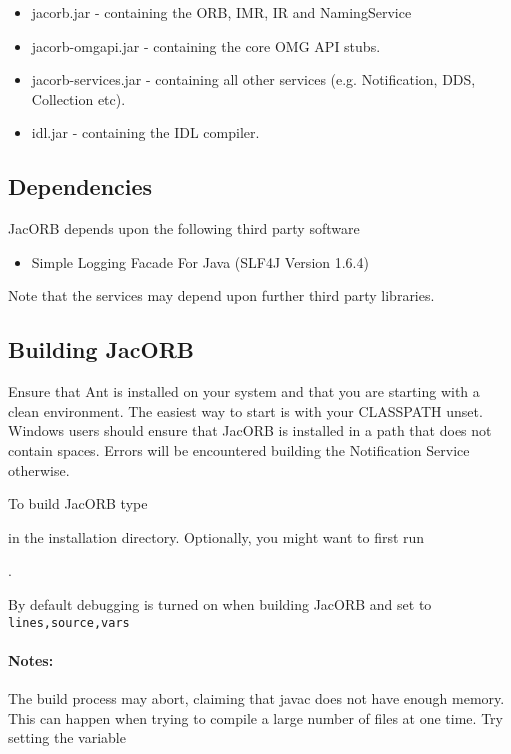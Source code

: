 \begin{itemize}
\item jacorb.jar          - containing the ORB, IMR, IR and NamingService
\item jacorb-omgapi.jar   - containing the core OMG API stubs.
\item jacorb-services.jar - containing all other services (e.g. Notification, DDS, Collection etc).
\item idl.jar             - containing the IDL compiler.
\end{itemize}

\subsection{Dependencies}

JacORB depends upon the following third party software
\begin{itemize}
\item Simple Logging Facade For Java (SLF4J Version 1.6.4)
\end{itemize}

Note that the services may depend upon further third party libraries.

\subsection{Building JacORB}
\label{sec:building}

Ensure that Ant is installed on your system and that you are starting with a
clean environment. The easiest way to start is with your CLASSPATH
unset. Windows users should ensure that JacORB is installed in a path that does
not contain spaces. Errors will be encountered building the Notification Service
otherwise.

To build JacORB type


in the installation directory. Optionally, you might want to first run

.

By default debugging is turned on when building JacORB and set to {\tt lines,source,vars}
\paragraph{Notes:}
The build process may abort, claiming that javac does not have enough
memory. This can happen when trying to compile a large number of files at one
time. Try setting the variable

